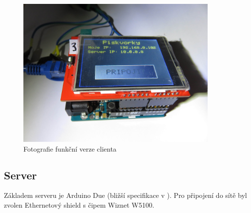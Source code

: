 \documentclass[a4paper,12pt, twoside]{article} %
\begin{document}
\begin{figure}[hbtp]
\centering
\includegraphics[width=10cm]{img/foto/HW_client.jpg}
\caption{\label{fig:HW_client} Fotografie funkční verze clienta}
\end{figure}

\subsection{Server}
\label{sec:server}
Základem serveru je Arduino Due (bližší specifikace v \cite{ArduinoDue_page}). Pro připojení do sítě byl zvolen Ethernetový shield s čipem Wiznet W5100. 
\end{document}
